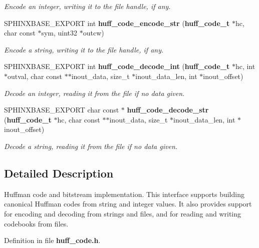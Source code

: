 \begin{DoxyCompactItemize}
\begin{DoxyCompactList}\small\item\em Encode an integer, writing it to the file handle, if any. \end{DoxyCompactList}\item 
S\-P\-H\-I\-N\-X\-B\-A\-S\-E\-\_\-\-E\-X\-P\-O\-R\-T int {\bf huff\-\_\-code\-\_\-encode\-\_\-str} ({\bf huff\-\_\-code\-\_\-t} $\ast$hc, char const $\ast$sym, uint32 $\ast$outcw)\label{huff__code_8h_a24fe76f501a7a0485f3e9485c60fae32}

\begin{DoxyCompactList}\small\item\em Encode a string, writing it to the file handle, if any. \end{DoxyCompactList}\item 
S\-P\-H\-I\-N\-X\-B\-A\-S\-E\-\_\-\-E\-X\-P\-O\-R\-T int {\bf huff\-\_\-code\-\_\-decode\-\_\-int} ({\bf huff\-\_\-code\-\_\-t} $\ast$hc, int $\ast$outval, char const $\ast$$\ast$inout\-\_\-data, size\-\_\-t $\ast$inout\-\_\-data\-\_\-len, int $\ast$inout\-\_\-offset)\label{huff__code_8h_a9155dd07a0a24393ef0e4e66cb314140}

\begin{DoxyCompactList}\small\item\em Decode an integer, reading it from the file if no data given. \end{DoxyCompactList}\item 
S\-P\-H\-I\-N\-X\-B\-A\-S\-E\-\_\-\-E\-X\-P\-O\-R\-T char const $\ast$ {\bf huff\-\_\-code\-\_\-decode\-\_\-str} ({\bf huff\-\_\-code\-\_\-t} $\ast$hc, char const $\ast$$\ast$inout\-\_\-data, size\-\_\-t $\ast$inout\-\_\-data\-\_\-len, int $\ast$inout\-\_\-offset)\label{huff__code_8h_aec0908ece3a695f8a3f6619d8d726e57}

\begin{DoxyCompactList}\small\item\em Decode a string, reading it from the file if no data given. \end{DoxyCompactList}\end{DoxyCompactItemize}


\subsection{Detailed Description}
Huffman code and bitstream implementation. This interface supports building canonical Huffman codes from string and integer values. It also provides support for encoding and decoding from strings and files, and for reading and writing codebooks from files. 

Definition in file {\bf huff\-\_\-code.\-h}.

